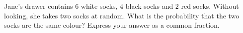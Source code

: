 Jane's drawer contains $6$ white socks, $4$ black socks and $2$ red socks. Without looking, she takes two socks at random. What is the probability that the two socks are the same colour? Express your answer as a common fraction.
